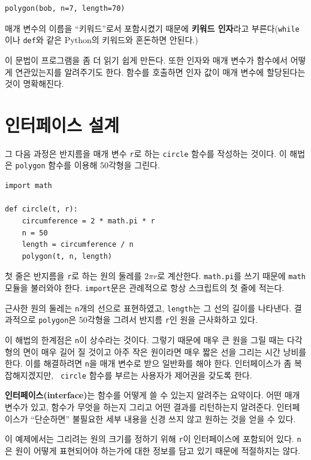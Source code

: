 \documentclass[10pt]{book}
\begin{document}
\begin{verbatim}
polygon(bob, n=7, length=70)
\end{verbatim}
%
매개 변수의 이름을 ``키워드''로서 포함시켰기 때문에 {\bf 키워드
  인자}라고 부른다({\tt while}이나 {\tt def}와 같은 Python의 키워드와
혼돈하면 안된다.)


이 문법이 프로그램을 좀 더 읽기 쉽게 만든다.  또한 인자와 매개 변수가
함수에서 어떻게 연관있는지를 알려주기도 한다.  함수를 호출하면 인자
값이 매개 변수에 할당된다는 것이 명확해진다.



\section{인터페이스 설계}

그 다음 과정은 반지름을 매개 변수 {\tt r}로 하는 {\tt circle} 함수를
작성하는 것이다.  이 해법은 {\tt polygon} 함수를 이용해 50각형을 그린다.

\begin{verbatim}
import math

def circle(t, r):
    circumference = 2 * math.pi * r
    n = 50
    length = circumference / n
    polygon(t, n, length)
\end{verbatim}
%
첫 줄은 반지름을 {\tt r}로 하는 원의 둘레를 $ 2 \pi r$로 계산한다.
{\tt math.pi}를 쓰기 때문에 {\tt math} 모듈을 불러와야 한다.
{\tt import}문은 관례적으로 항상 스크립트의 첫 줄에 적는다.

근사한 원의 둘레는 {\tt n}개의 선으로 표현하였고, {\tt length}는 그
선의 길이를 나타낸다.  결과적으로 {\tt polygon}은 50각형을 그려서
반지름 {\tt r}인 원을 근사화하고 있다.

이 해법의 한계점은 {\tt n}이 상수라는 것이다.  그렇기 때문에 매우 큰
원을 그릴 때는 다각형의 면이 매우 길어 질 것이고 아주 작은 원이라면
매우 짧은 선을 그리는 시간 낭비를 한다.  이를 해결하려면 {\tt n}을 매개
변수로 받으 일반화를 해야 한다. 인터페이스가 좀 복잡해지겠지만, {\tt
  circle} 함수를 부르는 사용자가 제어권을 갖도록 한다.

{\bf 인터페이스(interface)}는 함수를 어떻게 쓸 수 있는지 알려주는
요약이다.  어떤 매개 변수가 있고, 함수가 무엇을 하는지 그리고 어떤
결과를 리턴하는지 알려준다.  인터페이스가 ``단순하면'' 불필요한 세부
내용을 신경 쓰지 않고 원하는 것을 얻을 수 있다.

이 예제에서는 그리려는 원의 크기를 정하기 위해 {\tt r}이 인터페이스에
포함되어 있다.  {\tt n}은 원이 어떻게 표현되어야 하는가에 대한 정보를
담고 있기 때문에 적절하지는 않다.
\end{document}
